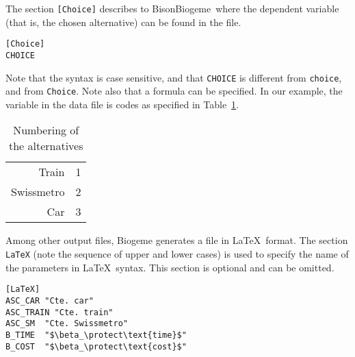 \documentclass[12pt,a4paper]{article}
\newcommand{\BBIOGEME}{BisonBiogeme}
\begin{document}
The section \lstinline$[Choice]$ describes to \BBIOGEME\ where the dependent variable (that is, the chosen alternative) can be found in the file. 
\begin{lstlisting}[style=nonumbers]
[Choice]
CHOICE   
\end{lstlisting}
  Note that the syntax is case sensitive, and that \texttt{CHOICE} is
  different from \texttt{choice}, and from \texttt{Choice}. Note also
  that a formula can be specified. In our example, the variable in the
  data file is codes as specified in Table~\ref{tab:choice}.

\begin{table}[htb]
\begin{center}
\begin{tabular}{rl}
Train & 1 \\
Swissmetro & 2 \\
Car & 3
\end{tabular}
\end{center}
\caption{\label{tab:choice}Numbering of the alternatives}
\end{table}

Among other output files, Biogeme generates a file in
\LaTeX\ format. The section \lstinline$LaTeX$ (note the sequence of
upper and lower cases) is used to specify the name of the parameters 
in \LaTeX\ syntax.  This section is optional
and can be omitted.

\begin{lstlisting}[style=nonumbers]
[LaTeX]
ASC_CAR "Cte. car"
ASC_TRAIN "Cte. train"
ASC_SM	"Cte. Swissmetro"
B_TIME	"$\beta_\protect\text{time}$"
B_COST	"$\beta_\protect\text{cost}$"
\end{lstlisting}
\end{document}
